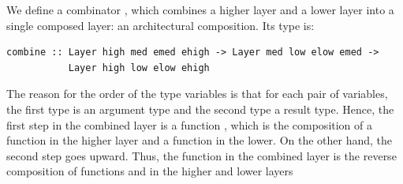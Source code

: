 \documentclass{llncs}
\begin{document}



We define a combinator , which combines a higher layer and a lower layer into a single composed layer: an architectural composition. Its type is:

\begin{small}
\begin{verbatim}
combine :: Layer high med emed ehigh -> Layer med low elow emed -> 
           Layer high low elow ehigh
\end{verbatim}
\end{small}

The reason for the order of the type variables is that for each pair of variables, the first type is an argument type and the second type  a result type. Hence, the first step in the combined layer is a function , which is the composition of a function  in the higher layer and a function  in the lower. On the other hand, the second step goes upward.  Thus, the function  in the combined layer is the reverse composition of functions  and  in the higher and lower layers
  
\end{document}
